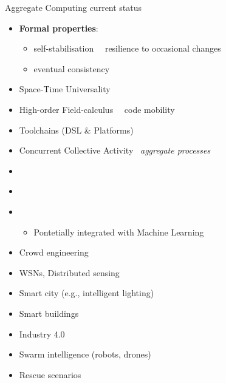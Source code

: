 \documentclass[8pt, aspectratio=169, handout]{beamer}
\begin{document}
\begin{frame}[allowframebreaks]{Aggregate Computing current status}
  \begin{card}
    \begin{itemize}
      \item \textbf{Formal properties}:
      \begin{itemize}
        \item self-stabilisation~\cite{viroli2018selfstab} \faArrowRight\, resilience to occasional changes
        \item eventual consistency~\cite{10.1145/3105758}
      \end{itemize}
      \item Space-Time Universality~\cite{audrito2018space}
      \item High-order Field-calculus~\cite{audrito2019tocl} \faArrowRight \, code mobility
      \item Toolchains (DSL \& Platforms)
      \item Concurrent Collective Activity \faArrowRight\, \emph{aggregate processes}~\cite{casadei2019coord-procs}
    \end{itemize}
  \end{card}
  \begin{card}
    \begin{itemize}
      \item {}~\cite{zambonelli2021time}
      \item {}~\cite{DBLP:journals/jss/AudritoCDSV21}
      \item {}~\cite{casadei2020pulverization}
      \begin{itemize}
        \item Pontetially integrated with Machine Learning~\cite{aguzzi2021research, aguzzi2022towards}
      \end{itemize}
    \end{itemize}
  \end{card}
  \begin{card}
    \begin{itemize}
      \item Crowd engineering~\cite{beal2015aggregate-programming,casadei2019fgcs}
      \item WSNs, Distributed sensing~\cite{casadei2018programming-actor-based-cas}
      \item Smart city (e.g., intelligent lighting)~\cite{pianini2021fgcs}
      \item Smart buildings~\cite{mariani2019fluidware}
      \item Industry 4.0~\cite{casadei2019scc}
      \item Swarm intelligence (robots, drones)~\cite{casadei2020eaai}
      \item Rescue scenarios~\cite{viroli2017aggregate-plans}
    \end{itemize}
  \end{card}
\end{frame}
\end{document}
